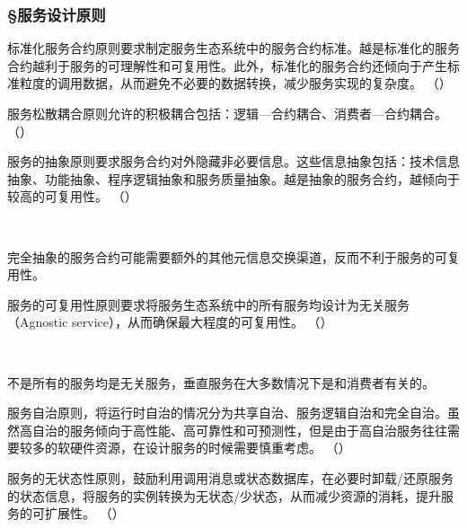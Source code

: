 \subsubsection*{\S 服务设计原则}
\setcounter{problemname}{0}

\begin{problem}
	标准化服务合约原则要求制定服务生态系统中的服务合约标准。越是标准化的服务合约越利于服务的可理解性和可复用性。此外，标准化的服务合约还倾向于产生标准粒度的调用数据，从而避免不必要的数据转换，减少服务实现的复杂度。
	\hfill （）
\end{problem}


\begin{problem}
	服务松散耦合原则允许的积极耦合包括：逻辑—合约耦合、消费者—合约耦合。
	\hfill （）
\end{problem}


\begin{problem}
	服务的抽象原则要求服务合约对外隐藏非必要信息。这些信息抽象包括：技术信息抽象、功能抽象、程序逻辑抽象和服务质量抽象。越是抽象的服务合约，越倾向于较高的可复用性。
	\hfill （）
\end{problem}
\\ \begin{solution}
	完全抽象的服务合约可能需要额外的其他元信息交换渠道，反而不利于服务的可复用性。
\end{solution}


\begin{problem}
	服务的可复用性原则要求将服务生态系统中的所有服务均设计为无关服务（Agnostic service），从而确保最大程度的可复用性。
	\hfill （）
\end{problem}
\\ \begin{solution}
	不是所有的服务均是无关服务，垂直服务在大多数情况下是和消费者有关的。
\end{solution}


\begin{problem}
	服务自治原则，将运行时自治的情况分为共享自治、服务逻辑自治和完全自治。虽然高自治的服务倾向于高性能、高可靠性和可预测性，但是由于高自治服务往往需要较多的软硬件资源，在设计服务的时候需要慎重考虑。
	\hfill （）
\end{problem}


\begin{problem}
	服务的无状态性原则，鼓励利用调用消息或状态数据库，在必要时卸载/还原服务的状态信息，将服务的实例转换为无状态/少状态，从而减少资源的消耗，提升服务的可扩展性。
	\hfill （）
\end{problem}


